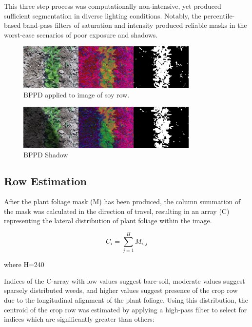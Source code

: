 \documentclass[authoryear]{elsarticle}
\begin{document}
This three step process was computationally non-intensive, yet produced
sufficient segmentation in diverse lighting conditions. Notably, the
percentile-based band-pass filters of saturation and intensity
produced reliable masks in the worst-case scenarios of poor exposure and shadows.

\begin{figure}
  \centering
  \includegraphics[width=0.8\textwidth,natwidth=610,natheight=642]{bppd_normal.jpg}
  \caption{BPPD applied to image of soy row.}
  \label{fig:bppd_normal}
\end{figure}

\begin{figure}
  \centering
  \includegraphics[width=0.8\textwidth,natwidth=610,natheight=642]{bppd_shadow.jpg}
  \caption{BPPD Shadow}
  \label{fig:bppd_shadow}
\end{figure}

\subsection{Row Estimation}
After the plant foliage mask (M) has been produced, the column
summation of the mask was calculated in the direction of travel,
resulting in an array (C) representing the lateral distribution of
plant foliage within the image. 

\begin{equation}
  C_{i} = \displaystyle\sum_{j=1}^{H} M_{i,j}
  \label{eq:col_sum}
\end{equation}
\begin{flushleft}
where H=240
\end{flushleft}

Indices of the C-array with low values suggest bare-soil, moderate
values suggest sparsely distributed weeds, and higher values suggest
presence of the crop row due to the longitudinal alignment of the
plant foliage. Using this distribution, the centroid of the crop row
was estimated by applying a high-pass filter to select for indices
which are significantly greater than others: 
\end{document}

